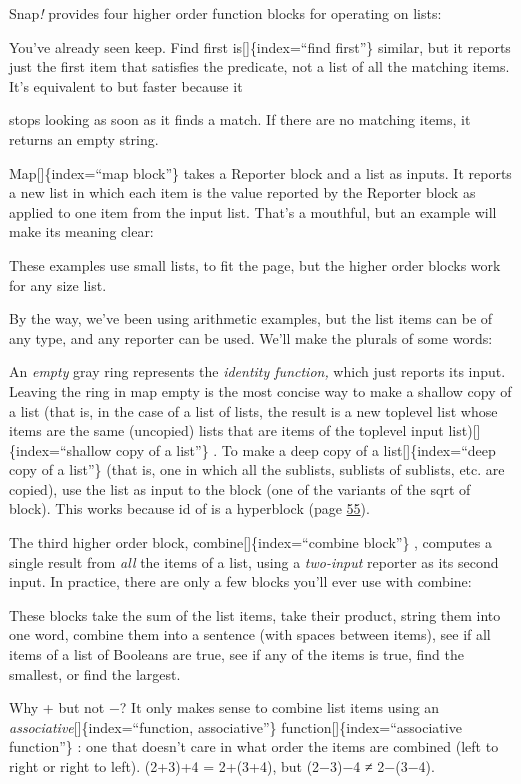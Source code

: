 \documentclass[
  letterpaper,
]{book}
\begin{document}
Snap\emph{!} provides four higher order function blocks for operating on
lists:

\label{map}{}You've already seen keep. Find first
is{[}{]}\{index=``find first''\} similar, but it reports just the first
item that satisfies the predicate, not a list of all the matching items.
It's equivalent to but faster because it

stops looking as soon as it finds a match. If there are no matching
items, it returns an empty string.

Map{[}{]}\{index=``map block''\} takes a Reporter block and a list as
inputs. It reports a new list in which each item is the value reported
by the Reporter block as applied to one item from the input list. That's
a mouthful, but an example will make its meaning clear:

These examples use small lists, to fit the page, but the higher order
blocks work for any size list.

By the way, we've been using arithmetic examples, but the list items can
be of any type, and any reporter can be used. We'll make the plurals of
some words:

An \emph{empty} gray ring represents the \emph{identity function,} which
just reports its input. Leaving the ring in map empty is the most
concise way to make a shallow copy of a list (that is, in the case of a
list of lists, the result is a new toplevel list whose items are the
same (uncopied) lists that are items of the toplevel input
list){[}{]}\{index=``shallow copy of a list''\} . To make a deep copy of
a list{[}{]}\{index=``deep copy of a list''\} (that is, one in which all
the sublists, sublists of sublists, etc. are copied), use the list as
input to the block (one of the variants of the sqrt of block). This
works because id of is a hyperblock (page \hyperref[hyperblocks]{55}).

The third higher order block, combine{[}{]}\{index=``combine block''\} ,
computes a single result from \emph{all} the items of a list, using a
\emph{two-input} reporter as its second input. In practice, there are
only a few blocks you'll ever use with combine:

These blocks take the sum of the list items, take their product, string
them into one word, combine them into a sentence (with spaces between
items), see if all items of a list of Booleans are true, see if any of
the items is true, find the smallest, or find the largest.

Why + but not −? It only makes sense to combine list items using an
\emph{associative}{[}{]}\{index=``function, associative''\}
function{[}{]}\{index=``associative function''\} : one that doesn't care
in what order the items are combined (left to right or right to left).
(2+3)+4 = 2+(3+4), but (2−3)−4 ≠ 2−(3−4).
\end{document}
